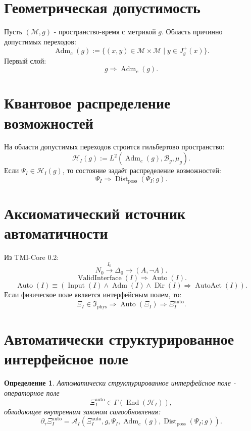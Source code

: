 \documentclass[12pt,a4paper]{article}
\newtheorem{definition}{Определение}
\DeclareMathOperator{\Valid}{ValidInterface}
\DeclareMathOperator{\Auto}{Auto}
\DeclareMathOperator{\Input}{Input}
\DeclareMathOperator{\Adm}{Adm}
\DeclareMathOperator{\Dir}{Dir}
\DeclareMathOperator{\AutoAct}{AutoAct}
\DeclareMathOperator{\Dist}{Dist}
\DeclareMathOperator{\End}{End}
\newcommand{\M}{\mathcal M}
\newcommand{\B}{\mathcal B}
\newcommand{\Hcal}{\mathcal H}
\newcommand{\Ispace}{\mathfrak I}
\newcommand{\XiAuto}{\Xi_I^{\mathrm{auto}}}
\begin{document}
\section{Геометрическая допустимость}
Пусть \((\M,g)\) - пространство-время с метрикой \(g\). Область причинно допустимых переходов:
\begin{equation}
\Adm_c(g):=\{(x,y)\in\M\times\M\mid y\in J_g^+(x)\}.
\end{equation}
Первый слой:
\begin{equation}
\boxed{g\Rightarrow\Adm_c(g).}
\end{equation}

\section{Квантовое распределение возможностей}
На области допустимых переходов строится гильбертово пространство:
\begin{equation}
\Hcal_I(g):=L^2(\Adm_c(g),\B_g,\mu_g).
\end{equation}
Если \(\Psi_I\in\Hcal_I(g)\), то состояние задаёт распределение возможностей:
\begin{equation}
\boxed{\Psi_I\Rightarrow\Dist_{\mathrm{poss}}(\Psi_I;g).}
\end{equation}

\section{Аксиоматический источник автоматичности}
Из TMI-Core 0.2:
\begin{equation}
\boxed{N_0\xrightarrow{I_0}\Delta_0\to(A,\neg A).}
\end{equation}
\begin{equation}
\boxed{\Valid(I)\Rightarrow\Auto(I).}
\end{equation}
\begin{equation}
\boxed{\Auto(I)\equiv(\Input(I)\land\Adm(I)\land\Dir(I)\Rightarrow\AutoAct(I)).}
\end{equation}
Если физическое поле является интерфейсным полем, то:
\begin{equation}
\boxed{\Xi_I\in\Ispace_{\mathrm{phys}}\Rightarrow\Auto(\Xi_I)\Rightarrow\XiAuto.}
\end{equation}

\section{Автоматически структурированное интерфейсное поле}
\begin{definition}
Автоматически структурированное интерфейсное поле - операторное поле
\begin{equation}
\XiAuto\in\Gamma(\End(\Hcal_I)),
\end{equation}
обладающее внутренним законом самообновления:
\begin{equation}
\partial_\tau\XiAuto=\mathcal A_I(\XiAuto,g,\Psi_I,\Adm_c(g),\Dist_{\mathrm{poss}}(\Psi_I;g)).
\end{equation}
\end{definition}
\end{document}

